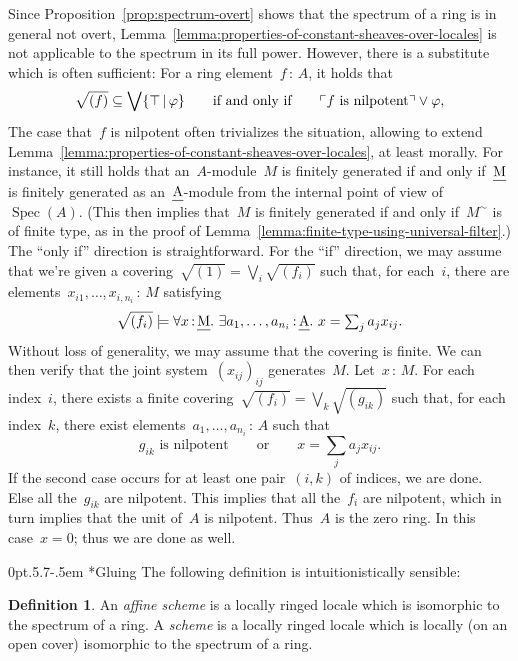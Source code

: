 \documentclass[10pt,reqno,a4paper]{amsbook}
\makeatletter
\theoremstyle{definition}
\newtheorem{defn}{Definition}[section]
\theoremstyle{plain}
\theoremstyle{remark}
\let\oldul\ul
\renewcommand{\ul}[1]{\text{\oldul{$#1$}}}
\DeclareMathOperator{\Spec}{Spec}
\newcommand{\?}{\,{:}\,}
\renewcommand{\_}{\mathpunct{.}\,}
\newcommand{\speak}[1]{\ulcorner\text{\textnormal{#1}}\urcorner}
\def\subsection{\@startsection{subsection}{2}%
  {0pt}{.5\linespacing\@plus.7\linespacing}{-.5em}%
  {\normalfont\bfseries}}
\makeatother
\begin{document}
{Since Proposition~\ref{prop:spectrum-overt} shows that the spectrum of a ring
is in general not overt,
Lemma~\ref{lemma:properties-of-constant-sheaves-over-locales} is not applicable
to the spectrum in its full power. However, there is a substitute which is often
sufficient: For a ring element~$f \? A$, it holds that
\[ \sqrt{(f)} \subseteq \bigvee \{ \top \,|\, \varphi \}
  \qquad\text{if and only if}\qquad
  \speak{$f$ is nilpotent} \vee \varphi, \]
The case that~$f$ is nilpotent often trivializes the situation, allowing to
extend Lemma~\ref{lemma:properties-of-constant-sheaves-over-locales}, at least
morally. For instance, it still holds that an~$A$-module~$M$ is finitely
generated if and only if~$\ul{M}$ is finitely
generated as an~$\ul{A}$-module from the internal point of view
of~$\Spec(A)$. (This then implies that~$M$ is finitely generated if and only
if~$M^\sim$ is of finite type, as in the proof of
Lemma~\ref{lemma:finite-type-using-universal-filter}.) The ``only if''
direction is straightforward. For the ``if'' direction, we may assume that
we're given a covering~$\sqrt{(1)} = \bigvee_i \sqrt{(f_i)}$ such that, for
each~$i$, there are elements~$x_{i1},\ldots,x_{i,n_i} \? M$ satisfying
\[ \sqrt{(f_i)} \models \forall x\?\ul{M}\_
  \exists a_1,\ldots,a_{n_i}\?\ul{A}\_
  x = \textstyle\sum_j a_j x_{ij}. \]
Without loss of generality, we may assume that the covering is finite. We can
then verify that the joint system~$(x_{ij})_{ij}$ generates~$M$. Let~$x \? M$. For
each index~$i$, there exists a finite covering~$\sqrt{(f_i)} = \bigvee_k
\sqrt{(g_{ik})}$ such that, for each index~$k$, there exist
elements~$a_1,\ldots,a_{n_i} \? A$ such that
\[ \text{$g_{ik}$ is nilpotent} \qquad\text{or}\qquad
  x = \textstyle\sum_j a_j x_{ij}. \]
If the second case occurs for at least one pair~$(i,k)$ of indices, we are
done. Else all the~$g_{ik}$ are nilpotent. This implies that all the~$f_i$ are
nilpotent, which in turn implies that the unit of~$A$ is nilpotent. Thus~$A$ is
the zero ring. In this case~$x = 0$; thus we are done as well.

\subsection*{Gluing} The following definition is intuitionistically sensible:

\begin{defn}\label{defn:scheme}
An \emph{affine scheme} is a locally ringed locale which is isomorphic to the
spectrum of a ring. A \emph{scheme} is a locally ringed locale which is locally
(on an open cover) isomorphic to the spectrum of a ring.
\end{defn}

}
\end{document}
